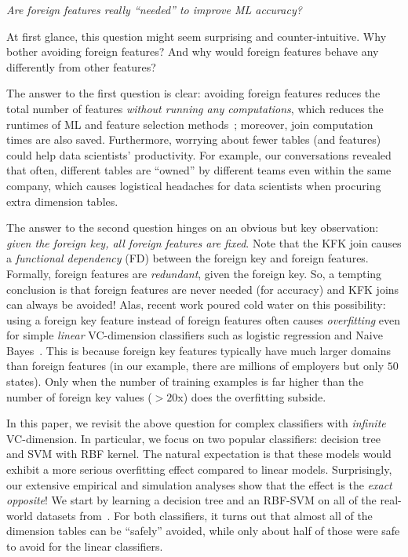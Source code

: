 \documentclass[sigconf]{acmart}
\begin{document}
\begin{center}\textit{Are foreign features really ``needed'' to improve ML accuracy?}\end{center}

At first glance, this question might seem surprising and counter-intuitive. Why bother avoiding foreign features? And why would foreign features behave any differently from other features? 

The answer to the first question is clear: avoiding foreign features reduces the total number of features \textit{without running any computations}, 
which reduces the runtimes of ML and feature selection methods~\cite{guyon}; moreover, join computation times are also saved. 
Furthermore, worrying about fewer tables (and features) could help data scientists' productivity. For example, our conversations revealed that often, different tables 
are ``owned'' by different teams even within the same company, which causes logistical headaches for data scientists when procuring extra dimension tables.

The answer to the second question hinges on an obvious but key observation: \textit{given the foreign key, all foreign features are fixed}. 
Note that the KFK join causes a \textit{functional dependency} (FD) between the foreign key and foreign features. 
Formally, foreign features are \textit{redundant}, given the foreign key. 
So, a tempting conclusion is that foreign features are never needed (for accuracy) and KFK joins can always be avoided! Alas, recent work poured cold water
on this possibility: using a foreign key feature instead of foreign features often causes \textit{overfitting} even for simple \textit{linear} VC-dimension classifiers such as 
logistic regression and Naive Bayes~\cite{hamlet}. This is because foreign key features typically have much larger domains than foreign features (in our example, 
there are millions of employers but only $50$ states). Only when the number of training examples is far higher than the number of foreign key values ($>20$x) does the overfitting subside.

In this paper, we revisit the above question for complex classifiers with \textit{infinite} VC-dimension. In particular, we focus on two popular classifiers: 
decision tree and SVM with RBF kernel. The natural expectation is that these models would exhibit a more serious overfitting effect compared to linear models. 
Surprisingly, our extensive empirical and simulation analyses show that the effect is the \textit{exact opposite}! We start by learning a decision tree and an RBF-SVM
on all of the real-world datasets from~\cite{hamlet}. For both classifiers, it turns out that almost all of the dimension tables can be ``safely'' avoided, while only 
about half of those were safe to avoid for the linear classifiers.
\end{document}
